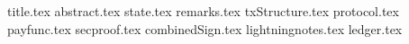 \documentclass[11pt]{llncs}
\begin{document}
\pagestyle{plain}
{title.tex}
{abstract.tex}
{state.tex}
{remarks.tex}
{txStructure.tex}
{protocol.tex}
{payfunc.tex}
{secproof.tex}
{combinedSign.tex}
{lightningnotes.tex}
{ledger.tex}


\end{document}
